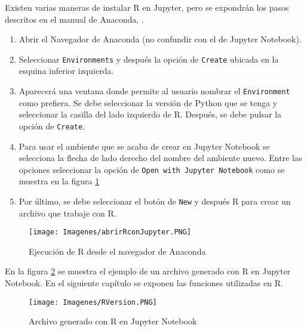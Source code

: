 Existen varias maneras de instalar \textsf{R} en \textsf{Jupyter}, pero se expondrán los pasos descritos en el manual de \textsf{Anaconda}, \cite{anaconda_doc}. 

\begin{enumerate}
	\item Abrir el Navegador de \textsf{Anaconda} (no confundir con el de \textsf{Jupyter Notebook}).
	
	\item Seleccionar \texttt{Environments} y después la opción de \texttt{Create} ubicada en la esquina inferior izquierda. 
	
	\item Aparecerá una ventana donde permite al usuario nombrar el \texttt{Environment} como prefiera. Se debe seleccionar la versión de \textsf{Python} que se tenga y seleccionar la casilla del lado izquierdo de \textsf{R}. Después, se debe pulsar la opción de \texttt{Create}. 
	
	\item Para usar el ambiente que se acaba de crear en \textsf{Jupyter Notebook} se selecciona la flecha de lado derecho del nombre del ambiente nuevo. Entre las opciones seleccionar la opción de \texttt{Open with Jupyter Notebook} como se muestra en la figura \ref{abrirRconJupyter}
	
	\item Por último, se debe seleccionar el botón de \texttt{New} y después \textsf{R} para crear un archivo que trabaje con \textsf{R}. 
\end{enumerate}

\begin{figure}[h]
	\begin{center}
		\texttt{[image: Imagenes/abrirRconJupyter.PNG]}
		\caption{Ejecución de R desde el navegador de Anaconda}
		\label{abrirRconJupyter}
	\end{center}
\end{figure}

En la figura \ref{rVersion} se muestra el ejemplo de un archivo generado con \textsf{R} en \textsf{Jupyter Notebook}. En el siguiente capítulo se exponen las funciones utilizadas en \textsf{R}. 

\begin{figure}[h]
	\begin{center}
		\texttt{[image: Imagenes/RVersion.PNG]}
		\caption{Archivo generado con R en Jupyter Notebook}
		\label{rVersion}
	\end{center}
\end{figure}


